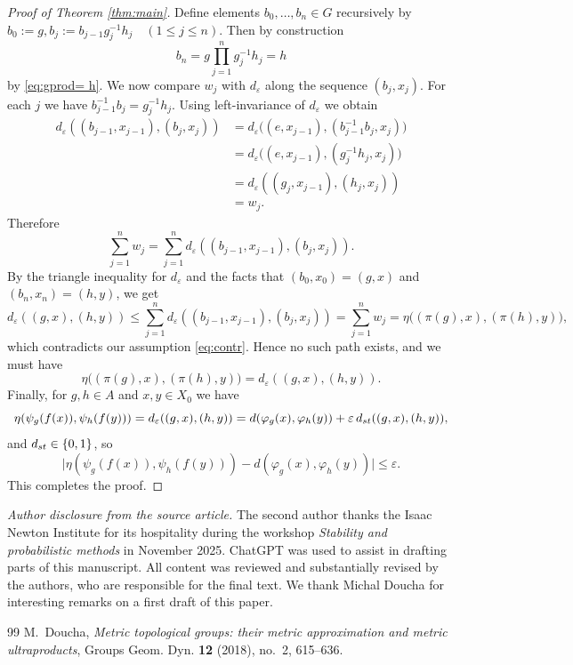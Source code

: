 \documentclass[10pt,a4paper]{amsart}
\begin{document}
\begin{proof}[Proof of Theorem \ref{thm:main}]
Define elements $b_0,\dots,b_n\in G$ recursively by
$b_0:=g, b_j := b_{j-1}g_j^{-1}h_j\quad (1\le j\le n).$ Then by construction
\[
b_n = g\prod_{j=1}^n g_j^{-1}h_j = h
\]
by \eqref{eq:gprod= h}. We now compare $w_j$ with $d_\varepsilon$ along the sequence $(b_j,x_j)$. For each $j$ we have
$b_{j-1}^{-1}b_j = g_j^{-1}h_j.$ Using left-invariance of $d_\varepsilon$ we obtain
\begin{align*}
d_\varepsilon((b_{j-1},x_{j-1}),(b_j,x_j))
&= d_\varepsilon\bigl((e,x_{j-1}),(b_{j-1}^{-1}b_j,x_j)\bigr)\\
&= d_\varepsilon\bigl((e,x_{j-1}),(g_j^{-1}h_j,x_j)\bigr)\\
&= d_\varepsilon((g_j,x_{j-1}),(h_j,x_j))\\
&= w_j.
\end{align*}
Therefore
\[
\sum_{j=1}^n w_j
= \sum_{j=1}^n d_\varepsilon((b_{j-1},x_{j-1}),(b_j,x_j)).
\]
By the triangle inequality for $d_\varepsilon$ and the facts that $(b_0,x_0)=(g,x)$ and $(b_n,x_n)=(h,y)$, we get
\[
d_\varepsilon((g,x),(h,y))
\le \sum_{j=1}^n d_\varepsilon((b_{j-1},x_{j-1}),(b_j,x_j))
= \sum_{j=1}^n w_j
= \eta\bigl((\pi(g),x),(\pi(h),y)\bigr),
\]
which contradicts our assumption \eqref{eq:contr}. Hence no such path exists, and we must have
\[
\eta\bigl((\pi(g),x),(\pi(h),y)\bigr)
= d_\varepsilon((g,x),(h,y)).
\]
Finally, for $g,h\in A$ and $x,y\in X_0$ we have
\[
\eta(\psi_g(f(x)),\psi_h(f(y)))
= d_\varepsilon((g,x),(h,y))
= d(\varphi_g(x),\varphi_h(y)) + \varepsilon\, d_{\rm st}((g,x),(h,y)),
\]
and $d_{\rm st}\in\{0,1\}$, so
\[
\bigl|\eta(\psi_g(f(x)),\psi_h(f(y))) - d(\varphi_g(x),\varphi_h(y))\bigr|
\le \varepsilon.
\]
This completes the proof.
\end{proof}


\noindent\textit{Author disclosure from the source article.}
The second author thanks the Isaac Newton Institute for its hospitality during the workshop \emph{Stability and probabilistic methods} in November 2025. ChatGPT was used to assist in drafting parts of this manuscript. All content was reviewed and substantially revised by the authors, who are responsible for the final text. We thank Michal Doucha for interesting remarks on a first draft of this paper.

\begin{thebibliography}{99}
 M.~Doucha, \emph{Metric topological groups: their metric approximation and metric ultraproducts}, Groups Geom. Dyn. \textbf{12} (2018), no.~2, 615--636.
\end{thebibliography}
\end{document}
